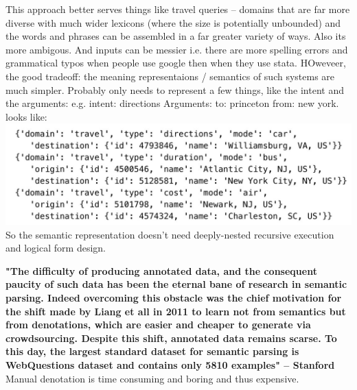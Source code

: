 \documentclass[pageno]{jpaper}
\begin{document}
This approach better serves things like travel queries -- domains that are far more diverse with much wider lexicons (where the size is potentially unbounded) and the words and phrases can be assembled in a far greater variety of ways. Also its more ambigous.  And inputs can be messier i.e. there are more spelling errors and grammatical typos when people use google then when they use stata. HOweveer, the good tradeoff: the meaning representaions / semantics of such systems are much simpler. Probably only needs to represent a few things, like the intent and the arguments: e.g. intent: directions Arguments: to: princeton from: new york.  
looks like:\\

\includegraphics[scale=.25]{imgs/trav.jpeg}\\
So the semantic representation doesn't need deeply-nested recursive execution and logical form design.

\textbf{"The difficulty of producing annotated data, and the consequent paucity of such data has been the eternal bane of research in semantic parsing. Indeed overcoming this obstacle was the chief motivation for the shift made by Liang et all in 2011 to learn not from semantics but from denotations, which are easier and cheaper to generate via crowdsourcing. Despite this shift, annotated data remains scarse. To this day, the largest standard dataset for semantic parsing is WebQuestions dataset and contains only 5810 examples" -- Stanford} Manual denotation is time consuming and boring and thus expensive. 
\end{document}
